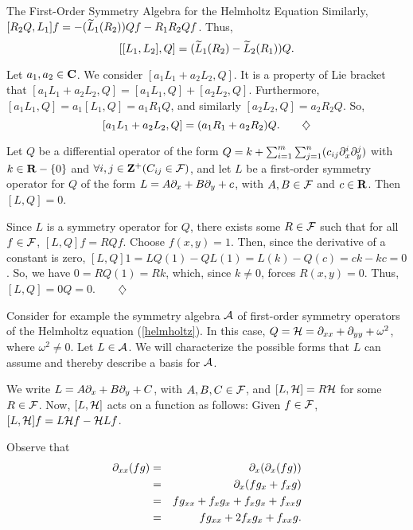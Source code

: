 \begin{section}{The First-Order Symmetry Algebra for the Helmholtz Equation}
Similarly, $[R_2 Q, L_1]f = -(\widetilde{L}_1 (R_2)) Qf - R_1 R_2 Qf$.  Thus,
\[
[[L_1,L_2], Q] = (\widetilde{L}_1 (R_2) - \widetilde{L}_2 (R_1)) Q.
\]

\noindent {}  Let $a_1, a_2 \in \mathbf{C}$.  We consider $[a_1 L_1 + a_2 L_2, Q]$.  It is a property of Lie bracket that $[a_1 L_1 + a_2 L_2, Q] = [a_1 L_1, Q] + [a_2 L_2, Q]$.  Furthermore, $[a_1 L_1, Q] = a_1 [L_1, Q] = a_1 R_1 Q$, and similarly $[a_2 L_2, Q] = a_2 R_2 Q$.  So,
\[
[a_1 L_1 + a_2 L_2, Q] = (a_1 R_1 + a_2 R_2) Q. \qquad \diamondsuit
\]

\begin{theorem}
\label{rez}
Let $Q$ be a differential operator of the form $Q = k + \sum_{i=1}^m\sum_{j=1}^n(c_{ij} \partial_{x}^i \partial_{y}^j)$ with $k \in \mathbf{R}-\{ 0 \}$ and $\forall i,j \in \mathbf{Z}^+(C_{ij} \in \mathcal{F})$, and let $L$ be a first-order symmetry operator for $Q$ of the form $L = A \partial_{x} + B \partial_{y} + c$, with $A, B \in \mathcal{F}$ and $c \in \mathbf{R}$.  Then $[L, Q] = 0$.
\end{theorem}

\proof
Since $L$ is a symmetry operator for $Q$, there exists some $R \in \mathcal{F}$ such that for all $f \in \mathcal{F}$, $[L, Q] f = R Q f$.  Choose $f(x,y) = 1$.  Then, since the derivative of a constant is zero, $[L, Q] 1 = L Q(1) - Q L(1) = L(k) - Q(c) = ck - kc = 0$.  So, we have $0 = R Q(1) = R k$, which, since $k \not= 0$, forces $R(x,y) = 0$.  Thus, $[L, Q] = 0 Q = 0$.$\qquad \diamondsuit$

\eex

Consider for example the symmetry algebra $\mathcal{A}$ of first-order symmetry operators of the Helmholtz equation (\ref{helmholtz}).  In this case, $Q = \mathcal{H} = \partial_{x x} + \partial_{y y} + \omega^2$, where $\omega^2 \not= 0$.  Let $L \in \mathcal{A}$.  We will characterize the possible forms that $L$ can assume and thereby describe a basis for $\mathcal{A}$.

We write $L = A \partial_{x} + B \partial_{y} + C$, with $A, B, C \in \mathcal{F}$, and $[L, \mathcal{H}] = R \mathcal{H}$ for some $R \in \mathcal{F}$.  Now, $[L, \mathcal{H}]$ acts on a function as follows:  Given $f \in \mathcal{F}$, $[L, \mathcal{H}] f = L \mathcal{H} f - \mathcal{H} L f$.

Observe that
\begin{eqnarray}
\nonumber	\partial_{x x} (f g) 	& = & \partial_{x} (\partial_{x} (f g)) \\
\nonumber			& = & \partial_{x} (f g_x + f_x g) \\
\nonumber			& = & f g_{xx} + f_x g_x + f_x g_x + f_{xx} g \\
\label{usingast}		& = & f g_{xx} + 2 f_x g_x + f_{xx} g.
\end{eqnarray}


\end{section}
